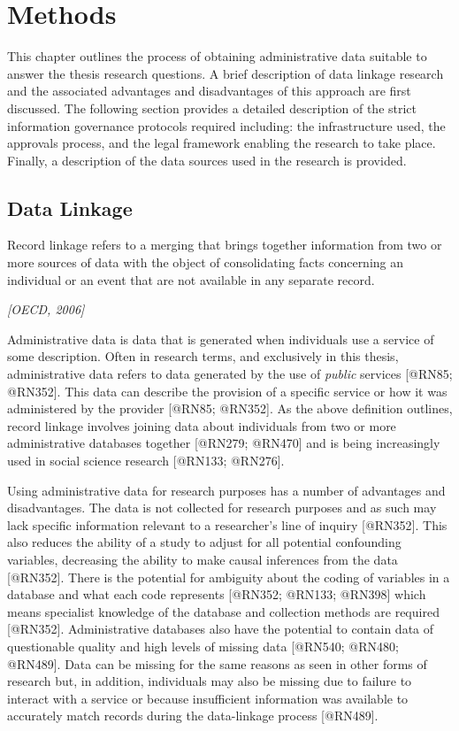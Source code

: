 \documentclass[]{article}
\title{}
\author{}
\date{}
\begin{document}
\chapter{Methods}\label{ch:data}

This chapter outlines the process of obtaining administrative data
suitable to answer the thesis research questions. A brief description of
data linkage research and the associated advantages and disadvantages of
this approach are first discussed. The following section provides a
detailed description of the strict information governance protocols
required including: the infrastructure used, the approvals process, and
the legal framework enabling the research to take place. Finally, a
description of the data sources used in the research is provided.

\section{Data Linkage}\label{sec:data-linkage}

\epigraph{Record linkage refers to a merging that brings together information from two or more sources of data with the object of consolidating facts concerning an individual or an event that are not available in any separate record.}{\textit{[OECD, 2006]}}

Administrative data is data that is generated when individuals use a
service of some description. Often in research terms, and exclusively in
this thesis, administrative data refers to data generated by the use of
\textit{public} services {[}@RN85; @RN352{]}. This data can describe the
provision of a specific service or how it was administered by the
provider {[}@RN85; @RN352{]}. As the above definition outlines, record
linkage involves joining data about individuals from two or more
administrative databases together {[}@RN279; @RN470{]} and is being
increasingly used in social science research {[}@RN133; @RN276{]}.

Using administrative data for research purposes has a number of
advantages and disadvantages. The data is not collected for research
purposes and as such may lack specific information relevant to a
researcher's line of inquiry {[}@RN352{]}. This also reduces the ability
of a study to adjust for all potential confounding variables, decreasing
the ability to make causal inferences from the data {[}@RN352{]}. There
is the potential for ambiguity about the coding of variables in a
database and what each code represents {[}@RN352; @RN133; @RN398{]}
which means specialist knowledge of the database and collection methods
are required {[}@RN352{]}. Administrative databases also have the
potential to contain data of questionable quality and high levels of
missing data {[}@RN540; @RN480; @RN489{]}. Data can be missing for the
same reasons as seen in other forms of research but, in addition,
individuals may also be missing due to failure to interact with a
service or because insufficient information was available to accurately
match records during the data-linkage process {[}@RN489{]}.
\end{document}
